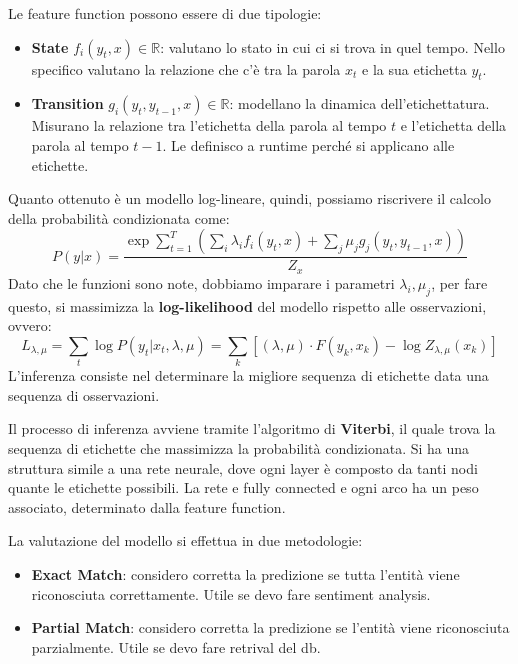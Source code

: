 Le feature function possono essere di due tipologie:
\begin{itemize}
      \item \textbf{State} $f_i(y_t, x) \in \mathbb{R}$: valutano lo stato in
            cui ci si trova in quel tempo. Nello specifico valutano la relazione
            che c'è tra la parola $x_t$ e la sua etichetta $y_t$.
      \item \textbf{Transition} $g_i(y_t, y_{t - 1}, x) \in \mathbb{R}$: modellano
            la dinamica dell'etichettatura. Misurano la relazione tra l'etichetta
            della parola al tempo $t$ e l'etichetta della parola al tempo $t - 1$.
            Le definisco a runtime perché si applicano alle etichette.
\end{itemize}

Quanto ottenuto è un modello log-lineare, quindi, possiamo riscrivere il calcolo
della probabilità condizionata come:
\begin{equation}
      P(y|x) = \frac{\exp \sum_{t = 1}^T\left( \sum_i \lambda_i f_i(y_t,x) +
      \sum_j \mu_j g_j(y_t,y_{t-1},x) \right)}{Z_x}
\end{equation}
Dato che le funzioni sono note, dobbiamo imparare i parametri $\lambda_i, \mu_j$,
per fare questo, si massimizza la \textbf{log-likelihood} del modello rispetto
alle osservazioni, ovvero:
\begin{equation}
      L_{\lambda,\mu} = \sum_{t} \log P(y_t|x_t, \lambda, \mu) = \sum_k \left[
            (\lambda, \mu) \cdot F(y_k, x_k) - \log Z_{\lambda, \mu}(x_k) \right]
\end{equation}
L'inferenza consiste nel determinare la migliore sequenza di etichette data una
sequenza di osservazioni.

Il processo di inferenza avviene tramite l'algoritmo di \textbf{Viterbi}, il quale
trova la sequenza di etichette che massimizza la probabilità condizionata. Si ha
una struttura simile a una rete neurale, dove ogni layer è composto da tanti nodi
quante le etichette possibili. La rete e fully connected e ogni arco ha un peso
associato, determinato dalla feature function.

La valutazione del modello si effettua in due metodologie:
\begin{itemize}
      \item \textbf{Exact Match}: considero corretta la predizione se tutta l'entità
            viene riconosciuta correttamente. Utile se devo fare sentiment analysis.
      \item \textbf{Partial Match}: considero corretta la predizione se l'entità
            viene riconosciuta parzialmente. Utile se devo fare retrival del db.
\end{itemize}
